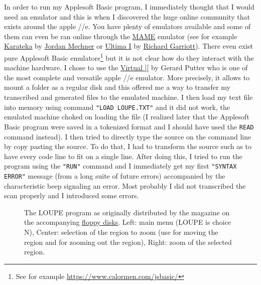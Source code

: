 In order to run my Applesoft Basic program, I immediately thought that I would
need an emulator and this is when I discovered the huge online community that
exists around the apple //e. You have plenty of emulators available and some of
them can even be ran online through the \href{https://www.mamedev.org/}{MAME}
emulator (see for
example \href{https://archive.org/details/Karateka_1984_Broderbund}{Karateka}
by \href{https://en.wikipedia.org/wiki/Jordan_Mechner}{Jordan Mechner}
or \href{https://archive.org/details/Ultima_I_1981_California_Pacific_Computer}{Ultima
I} by \href{https://en.wikipedia.org/wiki/Richard_Garriott}{Richard
Garriott}). There even exist pure Applesoft Basic emulators\footnote{See for
example \url{https://www.calormen.com/jsbasic/}} but it is not clear how do
they interact with the machine hardware. I chose to use
the \href{http://www.virtualii.com/}{Virtual ][} by Gerard Putter who is one of
the most complete and versatile apple //e emulator. More precisely, it allows
to mount a folder as a regular disk and this offered me a way to transfer my
transcribed and generated files to the emulated machine. I then load my text
file into memory using command {\tt "LOAD LOUPE.TXT"} and it did not work, the
emulated machine choked on loading the file (I realized later that the
Applesoft Basic program were saved in a tokenized format and I should have used
the {\tt READ} command instead). I then tried to directly type the source on
the command line by copy pasting the source. To do that, I had to transform the
source such as to have every code line to fit on a single line. After doing
this, I tried to run the program using the {\tt "RUN"} command and I
immediately get my first {\tt "SYNTAX ERROR"} message (from a long suite of
future errors) accompanied by the characteristic beep signaling an error. Most
probably I did not transcribed the scan properly and I introduced some
errors.\\

\begin{figure}
{%
\fboxsep=0pt
\hfill
{}
\hfill
{}
}
\caption{The LOUPE program as originally distributed by the magazine on the
accompanying \href{https://mirrors.apple2.org.za/ftp.apple.asimov.net/images/non-english/french/tremplinmicro/tremplinmicro_19_disks.zip}{floppy disks}. Left: main menu (LOUPE is choice N), Center: selection of the region to zoom
(use     for moving the region and  for zooming out the region), Right: zoom of the selected region. }
\label{fig:original-run}
\end{figure}

